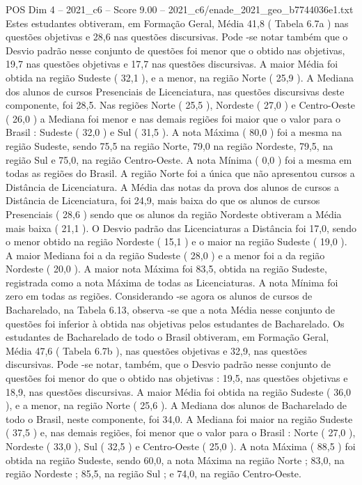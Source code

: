 \begin{textsample}{POS Dim 4 – 2021\_c6 – Score 9.00 – 2021\_c6/enade\_2021\_geo\_b7744036e1.txt}
Estes estudantes obtiveram, em Formação Geral, Média 41,8 ( Tabela 6.7a ) nas questões objetivas e 28,6 nas questões discursivas.
Pode -se notar também que o Desvio padrão nesse conjunto de questões foi menor que o obtido nas objetivas, 19,7 nas questões objetivas e 17,7 nas questões discursivas.
A maior Média foi obtida na região Sudeste ( 32,1 ), e a menor, na região Norte ( 25,9 ).
A Mediana dos alunos de cursos Presenciais de Licenciatura, nas questões discursivas deste componente, foi 28,5.
Nas regiões Norte ( 25,5 ), Nordeste ( 27,0 ) e Centro-Oeste ( 26,0 ) a Mediana foi menor e nas demais regiões foi maior que o valor para o Brasil : Sudeste ( 32,0 ) e Sul ( 31,5 ).
A nota Máxima ( 80,0 ) foi a mesma na região Sudeste, sendo 75,5 na região Norte, 79,0 na região Nordeste, 79,5, na região Sul e 75,0, na região Centro-Oeste.
A nota Mínima ( 0,0 ) foi a mesma em todas as regiões do Brasil.
A região Norte foi a única que não apresentou cursos a Distância de Licenciatura.
A Média das notas da prova dos alunos de cursos a Distância de Licenciatura, foi 24,9, mais baixa do que os alunos de cursos Presenciais ( 28,6 ) sendo que os alunos da região Nordeste obtiveram a Média mais baixa ( 21,1 ).
O Desvio padrão das Licenciaturas a Distância foi 17,0, sendo o menor obtido na região Nordeste ( 15,1 ) e o maior na região Sudeste ( 19,0 ).
A maior Mediana foi a da região Sudeste ( 28,0 ) e a menor foi a da região Nordeste ( 20,0 ).
A maior nota Máxima foi 83,5, obtida na região Sudeste, registrada como a nota Máxima de todas as Licenciaturas.
A nota Mínima foi zero em todas as regiões.
Considerando -se agora os alunos de cursos de Bacharelado, na Tabela 6.13, observa -se que a nota Média nesse conjunto de questões foi inferior à obtida nas objetivas pelos estudantes de Bacharelado.
Os estudantes de Bacharelado de todo o Brasil obtiveram, em Formação Geral, Média 47,6 ( Tabela 6.7b ), nas questões objetivas e 32,9, nas questões discursivas.
Pode -se notar, também, que o Desvio padrão nesse conjunto de questões foi menor do que o obtido nas objetivas : 19,5, nas questões objetivas e 18,9, nas questões discursivas.
A maior Média foi obtida na região Sudeste ( 36,0 ), e a menor, na região Norte ( 25,6 ).
A Mediana dos alunos de Bacharelado de todo o Brasil, neste componente, foi 34,0.
A Mediana foi maior na região Sudeste ( 37,5 ) e, nas demais regiões, foi menor que o valor para o Brasil : Norte ( 27,0 ), Nordeste ( 33,0 ), Sul ( 32,5 ) e Centro-Oeste ( 25,0 ).
A nota Máxima ( 88,5 ) foi obtida na região Sudeste, sendo 60,0, a nota Máxima na região Norte ; 83,0, na região Nordeste ; 85,5, na região Sul ; e 74,0, na região Centro-Oeste.

\end{textsample}
